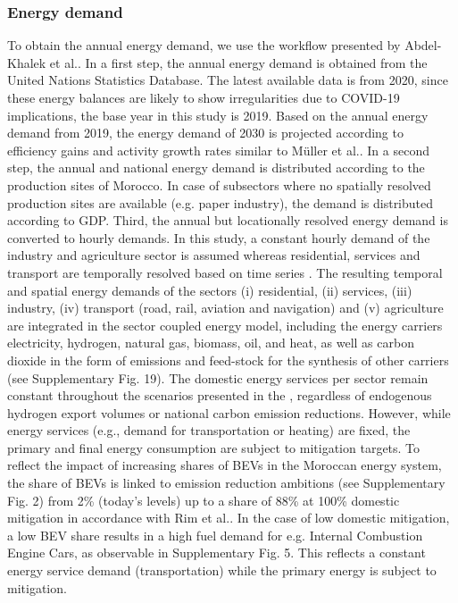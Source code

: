 \subsubsection*{Energy demand}
To obtain the annual energy demand, we use the workflow presented by Abdel-Khalek et al.\cite{Abdel-Khalek2025}. In a first step, the annual energy demand is obtained from the United Nations Statistics Database\cite{unstats2023}. The latest available data is from 2020, since these energy balances are likely to show irregularities due to COVID-19 implications, the base year in this study is 2019. Based on the annual energy demand from 2019, the energy demand of 2030 is projected according to efficiency gains and activity growth rates similar to M{\"u}ller et al.\cite{Muller2023}.
In a second step, the annual and national energy demand is distributed according to the production sites of Morocco.
In case of subsectors where no spatially resolved production sites are available (e.g. paper industry), the demand is distributed according to GDP.
Third, the annual but locationally resolved energy demand is converted to hourly demands. In this study, a constant hourly demand of the industry and agriculture sector is assumed whereas residential, services and transport are temporally resolved based on time series \cite{Brown2018a,Neumann2023,Abdel-Khalek2025}. 
The resulting temporal and spatial energy demands of the sectors
(i) residential,
(ii) services,
(iii) industry,
(iv) transport (road, rail, aviation and navigation) and
(v) agriculture
are integrated in the sector coupled energy model, including the energy carriers electricity, hydrogen, natural gas, biomass, oil, and heat, as well as carbon dioxide in the form of emissions and feed-stock for the synthesis of other carriers (see Supplementary Fig. 19). %
The domestic energy services per sector remain constant throughout the scenarios presented in the , regardless of endogenous hydrogen export volumes or national carbon emission reductions. However, while energy services (e.g., demand for transportation or heating) are fixed, the primary and final energy consumption are subject to \co mitigation targets. To reflect the impact of increasing shares of BEVs in the Moroccan energy system, the share of BEVs is linked to emission reduction ambitions (see Supplementary Fig. 2) from 2\% (today's levels) up to a share of 88\% at 100\% domestic \co mitigation in accordance with Rim et al.\cite{Rim2021}. %
In the case of low domestic \co mitigation, a low BEV share results in a high fuel demand for e.g. Internal Combustion Engine Cars, as observable in Supplementary Fig. 5. %
This reflects a constant energy service demand (transportation) while the primary energy is subject to \co mitigation.




